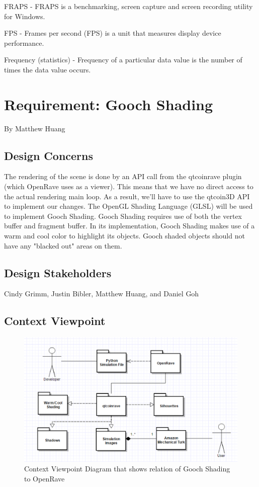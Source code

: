 \documentclass[10pt,journal,compsoc,draftclsnofoot]{IEEEtran}
\begin{document}
\begin{flushleft}
FRAPS - FRAPS is a benchmarking, screen capture and screen recording utility for Windows.

FPS - Frames per second (FPS) is a unit that measures display device performance.

Frequency (statistics) - Frequency of a particular data value is the number of times the data value occurs. \cite{freq}

\newpage

\section{Requirement: Gooch Shading}
\large{By Matthew Huang}

\normalsize
\subsection{Design Concerns}
The rendering of the scene is done by an API call from the qtcoinrave plugin (which OpenRave uses as a viewer).
This means that we have no direct access to the actual rendering main loop.
As a result, we'll have to use the qtcoin3D API to implement our changes.
The OpenGL Shading Language (GLSL) will be used to implement Gooch Shading. 
Gooch Shading requires use of both the vertex buffer and fragment buffer.
In its implementation, Gooch Shading makes use of a warm and cool color to highlight its objects.
Gooch shaded objects should not have any "blacked out" areas on them.

\subsection{Design Stakeholders}
Cindy Grimm, Justin Bibler, Matthew Huang, and Daniel Goh

\subsection{Context Viewpoint}

\begin{figure} [H]
  \includegraphics[scale=0.8]{Gooch_Shading_context.eps}
  \caption
{ \newline \hspace{\linewidth}
Context Viewpoint Diagram that shows relation of Gooch Shading to OpenRave}
  \label{fig:Gooch_Shading_context}
\end{figure}


\end{flushleft}
\end{document}

